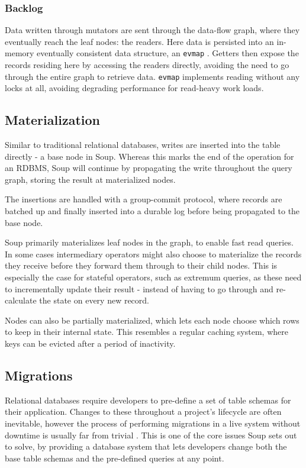 \documentclass[b5paper]{report}
\begin{document}
\subsubsection{Backlog}
Data written through mutators are sent through the data-flow graph, where they
eventually reach the leaf nodes: the readers. Here data is persisted into an
in-memory eventually consistent data structure, an \texttt{evmap} \cite{evmap}.
Getters then expose the records residing here by accessing the readers directly,
avoiding the need to go through the entire graph to retrieve data.
\texttt{evmap} implements reading without any locks at all, avoiding degrading
performance for read-heavy work loads.

\subsection{Materialization}
Similar to traditional relational databases, writes are inserted into the
table directly - a base node in Soup. Whereas this marks the end of the
operation for an RDBMS, Soup will continue by propagating the write throughout
the query graph, storing the result at materialized nodes.

The insertions are handled with a group-commit protocol, where records are
batched up and finally inserted into a durable log before being propagated to
the base node.

Soup primarily materializes leaf nodes in the graph, to enable fast read
queries. In some cases intermediary operators might also choose to materialize
the records they receive before they forward them through to their child nodes.
This is especially the case for stateful operators, such as extremum queries, as
these need to incrementally update their result - instead of having to go
through and re-calculate the state on every new record.

Nodes can also be partially materialized, which lets each node choose which rows
to keep in their internal state. This resembles a regular caching system, where
keys can be evicted after a period of inactivity.

\subsection{Migrations}
Relational databases require developers to pre-define a set of table schemas for
their application. Changes to these throughout a project's lifecycle are often
inevitable, however the process of performing migrations in a live
system without downtime is usually far from trivial \cite{stripe}. This is one
of the core issues Soup sets out to solve, by providing a database system that
lets developers change both the base table schemas and the pre-defined queries
at any point.
\end{document}
